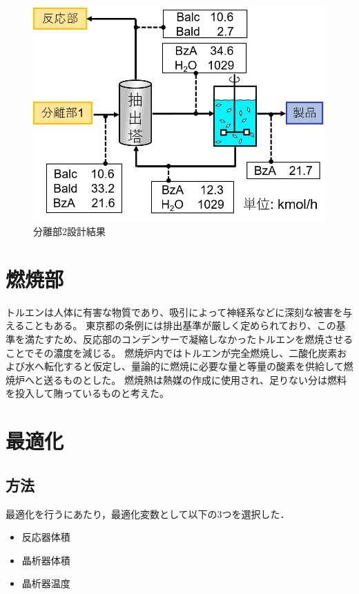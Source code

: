 \documentclass[a4j]{jsreport}
\begin{document}
\begin{figure}[htbp]
    \begin{center}
        \includegraphics[scale=0.7]{Separion2Conclusion.png}
        \caption{分離部2設計結果}
        \label{分離部2設計結果}
    \end{center}
\end{figure}

\newpage

\chapter{燃焼部}
トルエンは人体に有害な物質であり、吸引によって神経系などに深刻な被害を与えることもある。
東京都の条例には排出基準が厳しく定められており、この基準を満たすため、反応部のコンデンサーで凝縮しなかったトルエンを燃焼させることでその濃度を減じる。
燃焼炉内ではトルエンが完全燃焼し、二酸化炭素および水へ転化すると仮定し、量論的に燃焼に必要な量と等量の酸素を供給して燃焼炉へと送るものとした。
燃焼熱は熱媒の作成に使用され、足りない分は燃料を投入して賄っているものと考えた。


\chapter{最適化}
\section{方法}
最適化を行うにあたり，最適化変数として以下の3つを選択した．
\begin{itemize}
  \item 反応器体積
  \item 晶析器体積
  \item 晶析器温度
\end{itemize}
\end{document}
